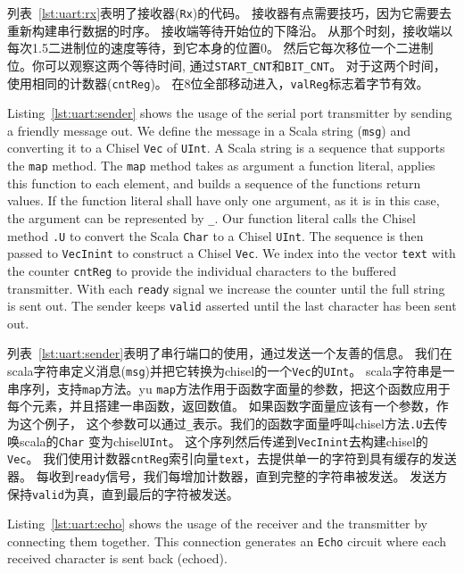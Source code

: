 \documentclass[%
    10pt,
    headinclude, footexclude,
    openright, %
    notitlepage,
    cleardoubleempty,
    headsepline,
    pointlessnumbers,
    bibtotoc, idxtotoc,
    ]{scrbook}
\newcommand{\code}[1]{{\small{\texttt{#1}}}}
\begin{document}
列表~\ref{lst:uart:rx}表明了接收器(\code{Rx})的代码。
接收器有点需要技巧，因为它需要去重新构建串行数据的时序。
接收端等待开始位的下降沿。
从那个时刻，接收端以每次1.5二进制位的速度等待，到它本身的位置0。
然后它每次移位一个二进制位。你可以观察这两个等待时间, 通过\code{START\_CNT}和\code{BIT\_CNT}。
对于这两个时间，使用相同的计数器(\code{cntReg})。
在8位全部移动进入，\code{valReg}标志着字节有效。

Listing~\ref{lst:uart:sender} shows the usage of the serial port transmitter
by sending a friendly message out. We define the message in a Scala
string (\code{msg}) and converting it to a Chisel \code{Vec} of \code{UInt}.
A Scala string is a sequence that supports the \code{map} method.
The \code{map} method takes as argument a function literal, applies this function to
each element, and builds a sequence of the functions return values.
If the function literal shall have only one argument, as it is in this case, the
argument can be represented by \code{\_}. Our function literal calls
the Chisel method \code{.U} to convert the Scala \code{Char} to a Chisel
\code{UInt}. The sequence is then passed to \code{VecInint} to construct
a Chisel \code{Vec}. We index into the vector \code{text} with the counter
\code{cntReg} to provide the individual characters to the buffered transmitter.
With each \code{ready} signal we increase the counter until the full string
is sent out. The sender keeps \code{valid} asserted until the last character
has been sent out.

列表~\ref{lst:uart:sender}表明了串行端口的使用，通过发送一个友善的信息。
我们在scala字符串定义消息(\code{msg})并把它转换为chisel的一个\code{Vec}的\code{UInt}。
scala字符串是一串序列，支持\code{map}方法。yu
\code{map}方法作用于函数字面量的参数，把这个函数应用于每个元素，并且搭建一串函数，返回数值。
如果函数字面量应该有一个参数，作为这个例子，
这个参数可以通过\code{\_}表示。我们的函数字面量呼叫chisel方法\code{.U}去传唤scala的\code{Char}
变为chisel\code{UInt}。
这个序列然后传递到\code{VecInint}去构建chisel的\code{Vec}。
我们使用计数器\code{cntReg}索引向量\code{text}，去提供单一的字符到具有缓存的发送器。
每收到\code{ready}信号，我们每增加计数器，直到完整的字符串被发送。
发送方保持\code{valid}为真，直到最后的字符被发送。


Listing~\ref{lst:uart:echo} shows the usage of the receiver and the transmitter
by connecting them together. This connection generates an \code{Echo} circuit where each
received character is sent back (echoed).
\end{document}
